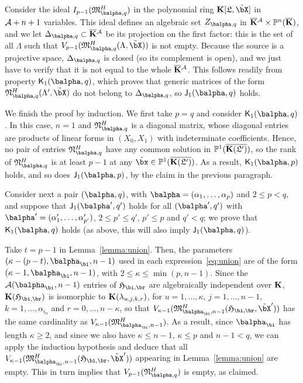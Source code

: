 \documentclass[12pt]{article}
\begin{document}
Consider the ideal $I_{p-1}(\mathfrak{M}^H_{\balpha,q})$ in the polynomial
ring $\KK[\mathfrak{L},\tilde\bX]$ in ${\cal A}+n+1$ variables. This ideal
defines an algebraic set $Z_{\balpha,q}$ in $\overline{\mathbf{K}}{}^{\cal A} \times
\mathbb{P}^n(\overline{\mathbf{K}})$, and we let $\Delta_{\balpha,q} \subset \KKbar{}^{\cal A}$ be its
projection on the first factor: this is the set of all $\Lambda$ such that
$V_{p-1}(\mathfrak{M}^H_{\balpha,q}(\Lambda,\tilde\bX))$ is not empty. Because the source is
a projective space, $\Delta_{\balpha,q}$ is closed (so its complement is
open), and we just have to verify that it is not equal to the whole
$\overline{\mathbf{K}}{}^{\cal A}$. This follows readily from property $\assJ_1(\balpha,q)$,
which proves that generic matrices of the form
$\mathfrak{N}^H_{\balpha,q}(\Lambda',\tilde\bX)$ do not belong to $\Delta_{\balpha,q}$, so 
$\assI_1(\balpha,q)$ holds.

We finish the proof by induction. We first take $p=q$ and consider
$\assJ_1(\balpha,q)$.  In this case, $n=1$ and
$\mathfrak{N}^H_{\balpha,q}$ is a diagonal matrix, whose diagonal
entries are products of linear forms in $(X_0,X_1)$ with indeterminate
coefficients. Hence, no pair of entries $\mathfrak{N}^H_{\balpha,q}$
have any common solution in $\mathbb{P}^1(\overline{\mathbf{K}(\mathfrak{L}')})$, so the rank of
$\mathfrak{N}^H_{\balpha,q}$ is at least $p-1$ at any $\tilde\bx \in
\P^1(\KKGpbar)$. As a result, $\assJ_1(\balpha,p)$ holds, and so does
$\assI_1(\balpha,p)$, by the claim in the previous paragraph.

Consider next a pair $(\balpha,q)$, with
$\balpha=(\alpha_1,\dots,\alpha_p)$ and $2 \le p < q$, and suppose
that $\assI_1(\balpha',q')$ holds for all $(\balpha',q')$ with
$\balpha'=(\alpha'_1,\dots,\alpha'_{p'})$, $2 \le p' \le q'$, $p' \le p$ and $q'
< q$; we prove that $\assJ_1(\balpha,q)$ holds (as above, this will
also imply $\assI_1(\balpha,q)$).

Take $t=p-1$ in Lemma~\ref{lemma:union}. Then, the parameters
$(\kappa-(p-t),\balpha_\bi,n-1)$ used in each
expression~\eqref{eq:union} are of the form
$(\kappa-1,\balpha_\bi,n-1)$, with $2 \le \kappa \le \min(p,n-1)$.
Since the ${\cal A}(\balpha_\bi,n-1)$ entries of $\mathfrak{H}_{\bi,\br}$ are algebraically
independent over $\mathbf{K}$, $\KK(\mathfrak{H}_{\bi,\br})$ is isomorphic to 
$\mathbf{K}(\lambda_{u,j,k,r})$, for $u=1,\dots,\kappa$, 
$j=1,\dots,n-1$, $k=1,\dots,\alpha_{i_u}$ 
and $r=0,\dots,n-\kappa$, so that $V_{\kappa-1}(\mathfrak{M}^H_{\balpha_\bi,n-1}(\mathfrak{H}_{\bi,\br},\tilde\bX'))$
has the same cardinality as 
$V_{\kappa-1}(\mathfrak{M}^H_{\balpha_\bi,n-1})$.
As a result, since $\balpha_\bi$ has length $\kappa\ge 2$, and since we also
have $\kappa \le n-1$, $\kappa \le p$ and $n-1 < q$, we can apply the
induction hypothesis and deduce that all
$V_{\kappa-1}(\mathfrak{M}^H_{\balpha_\bi,n-1}(\mathfrak{H}_{\bi,\br},\tilde\bX'))$ appearing
in Lemma~\ref{lemma:union} are empty. This in turn implies that
$V_{p-1}(\mathfrak{N}^H_{\balpha,q})$ is empty, as claimed.
\end{document}
